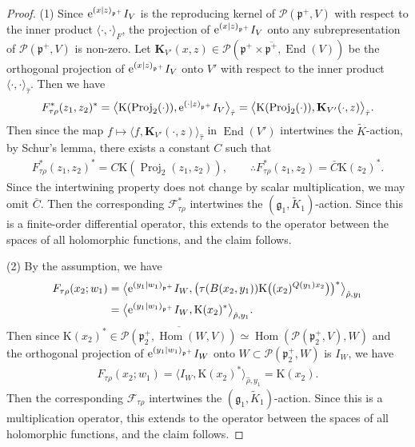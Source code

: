 \documentclass[pdftex]{sigma}
\numberwithin{equation}{section}
\newcommand{\bK}{\mathbf{K}}
\newcommand{\fg}{\mathfrak{g}}
\newcommand{\fp}{\mathfrak{p}}
\newcommand{\cF}{\mathcal{F}}
\newcommand{\cP}{\mathcal{P}}
\newcommand{\rK}{\mathrm{K}}
\newcommand{\End}{\operatorname{End}}
\newcommand{\Hom}{\operatorname{Hom}}
\newcommand{\Proj}{\operatorname{Proj}}
\begin{document}
\begin{proof}(1) Since ${\rm e}^{(x|z)_{\fp^+}}I_V$ is the reproducing kernel of $\cP(\fp^+,V)$ with respect to the inner product $\langle\cdot,\cdot\rangle_F$,
the projection of ${\rm e}^{(x|z)_{\fp^+}}I_V$ onto any subrepresentation of $\cP(\fp^+,V)$ is non-zero.
Let $\bK_{V'}(x,z)\in\cP(\fp^+\times\overline{\fp^+},\End(V))$ be the orthogonal projection of ${\rm e}^{(x|z)_{\fp^+}}I_V$ onto $V'$
with respect to the inner product $\langle\cdot,\cdot\rangle_{\hat{\tau}}$. Then we have
\begin{gather*}
F_{\tau\rho}^*(z_1,z_2)^* =\big\langle \rK(\Proj_2(\cdot)),{\rm e}^{(\cdot|z)_{\fp^+}}I_V\big\rangle_{\hat{\tau}}
=\big\langle \rK(\Proj_2(\cdot)),\bK_{V'}(\cdot,z)\big\rangle_{\hat{\tau}}.
\end{gather*}
Then since the map $f\mapsto \big\langle f,\bK_{V'}(\cdot,z)\big\rangle_{\hat{\tau}}$ in $\End(V')$ intertwines the $\tilde{K}$-action,
by Schur's lemma, there exists a constant $C$ such that
\begin{gather*} F_{\tau\rho}^*(z_1,z_2)^*=C\rK(\Proj_2(z_1,z_2)),\qquad \therefore F_{\tau\rho}^*(z_1,z_2)=\bar{C}\rK(z_2)^*. \end{gather*}
Since the intertwining property does not change by scalar multiplication, we may omit $\bar{C}$.
Then the corresponding $\cF_{\tau\rho}^*$ intertwines the $(\fg_1,\tilde{K}_1)$-action.
Since this is a finite-order differential operator, this extends to the operator between the spaces of all holomorphic functions,
and the claim follows.

(2) By the assumption, we have
\begin{align*}
F_{\tau\rho}(x_2;w_1)
&=\big\langle {\rm e}^{(y_1|w_1)_{\fp^+}}I_W,\bigl(\tau(B(x_2,y_1))\rK\big((x_2)^{Q(y_1)x_2}\big)\bigr)^*\big\rangle_{\hat{\rho},y_1}\\
&=\big\langle {\rm e}^{(y_1|w_1)_{\fp^+}}I_W,\rK(x_2)^*\big\rangle_{\hat{\rho},y_1}.
\end{align*}
Then since $\rK(x_2)^*\in\overline{\cP(\fp^+_2,\Hom(W,V))}\simeq \Hom(\cP(\fp^+_2,V),W)$ and the orthogonal projection of
${\rm e}^{(y_1|w_1)_{\fp^+}}I_W$ onto $W\subset\cP(\fp^+_2,W)$ is $I_W$, we have
\begin{gather*} F_{\tau\rho}(x_2;w_1)=\big\langle I_W,\rK(x_2)^*\big\rangle_{\hat{\rho},y_1}=\rK(x_2). \end{gather*}
Then the corresponding $\cF_{\tau\rho}$ intertwines the $(\fg_1,\tilde{K}_1)$-action.
Since this is a multiplication operator, this extends to the operator between the spaces of all holomorphic functions,
and the claim follows.
\end{proof}
\end{document}
